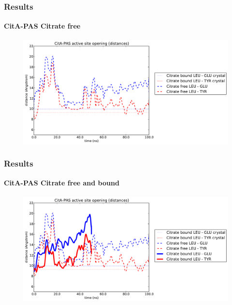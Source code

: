 \documentclass[english]{beamer}
\begin{document}

\begin{frame}
    \frametitle{Results}
    \framesubtitle{CitA-PAS Citrate free}

    \begin{figure}
        \includegraphics[width=1.05\linewidth]{figures/MD/distances_citrate_free.pdf}
    \end{figure}      
\end{frame}   
 


\begin{frame}
    \frametitle{Results}
    \framesubtitle{CitA-PAS Citrate free and bound}

    \begin{figure}
        \includegraphics[width=1.05\linewidth]{figures/MD/distances_both.pdf}
    \end{figure}      
\end{frame}   
 
\end{document}
